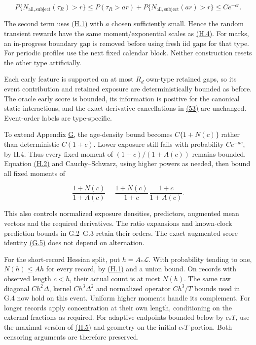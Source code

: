 \documentclass[11pt]{article}
\begin{document}
\begin{equation*}
P\{N_{\mathrm{all,subject}}(\tau_R)>r\}
 \leq P(\tau_R>ar)+P\{N_{\mathrm{all,subject}}(ar)>r\}
 \leq C e^{-cr}.
\tag{H.9}\label{eq:H.9}
\end{equation*}

The second term uses \hyperref[eq:H.1]{(H.1)} with \(a\) chosen sufficiently small. Hence the random transient rewards have the same moment/exponential scales as \hyperref[eq:H.4]{(H.4)}. For marks, an in-progress boundary gap is removed before using fresh iid gaps for that type. For periodic profiles use the next fixed calendar block. Neither construction resets the other type artificially.

Each early feature is supported on at most \(R_d\) own-type retained gaps, so its event contribution and retained exposure are deterministically bounded as before. The oracle early score is bounded, its information is positive for the canonical static interactions, and the exact derivative cancellations in \hyperref[eq:53]{(53)} are unchanged. Event-order labels are type-specific.

To extend Appendix \hyperref[sec:G]{G}, the age-density bound becomes \(C\{1+N(c)\}\) rather than deterministic \(C(1+c)\). Lower exposure still fails with probability \(Ce^{-ac}\), by H.4. Thus every fixed moment of \((1+c)/(1+A(c))\) remains bounded. Equation \hyperref[eq:H.2]{(H.2)} and Cauchy--Schwarz, using higher powers as needed, then bound all fixed moments of

\begin{equation*}
\frac{1+N(c)}{1+A(c)}
=\frac{1+N(c)}{1+c}\,\frac{1+c}{1+A(c)} .
\tag{H.10}\label{eq:H.10}
\end{equation*}

This also controls normalized exposure densities, predictors, augmented mean vectors and the required derivatives. The ratio expansions and known-clock prediction bounds in G.2--G.3 retain their orders. The exact augmented score identity \hyperref[eq:G.5]{(G.5)} does not depend on alternation.

For the short-record Hessian split, put \(h=A_*\mathscr L\). With probability tending to one, \(N(h)\leq A h\) for every record, by \hyperref[eq:H.1]{(H.1)} and a union bound. On records with observed length \(c<h\), their actual count is at most \(N(h)\). The same raw diagonal \(Ch^2\Delta\), kernel \(Ch^3\Delta^2\) and normalized operator \(Ch^3/T\) bounds used in G.4 now hold on this event. Uniform higher moments handle its complement. For longer records apply concentration at their own length, conditioning on the external fractions as required. For adaptive endpoints bounded below by \(c_*T\), use the maximal version of \hyperref[eq:H.5]{(H.5)} and geometry on the initial \(c_*T\) portion. Both censoring arguments are therefore preserved.
\end{document}
